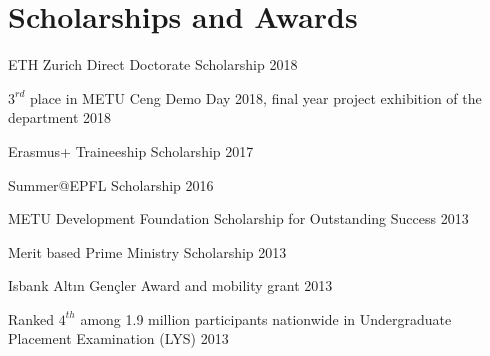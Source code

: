 \section{Scholarships and Awards}

\begin{denseouterlist}

\item ETH Zurich Direct Doctorate Scholarship \hfill 2018

\item $3^{rd}$ place in METU Ceng Demo Day 2018, final year project exhibition of the department \hfill 2018

\item Erasmus+ Traineeship Scholarship \hfill 2017

\item Summer@EPFL Scholarship \hfill 2016

\item METU Development Foundation Scholarship for Outstanding Success \hfill 2013

\item Merit based Prime Ministry Scholarship \hfill 2013

\item Isbank Altın Gençler Award and mobility grant \hfill 2013

\item Ranked $4^{th}$ among 1.9 million participants nationwide in Undergraduate Placement Examination (LYS) \hfill 2013

\end{denseouterlist}
